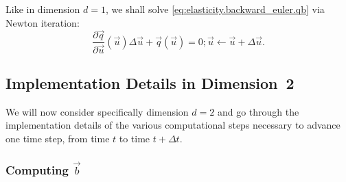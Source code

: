 Like in dimension $d = 1$, we shall solve \eqref{eq:elasticity.backward_euler.qb} via Newton iteration:
\begin{subequations}
\begin{equation*}
\frac{\partial\vec{q}}{\partial\vec{u}} \left( \vec{u} \right) \Delta \vec{u} + \vec{q} \left( \vec{u} \right) = 0;
\end{equation*}
\begin{equation*}
\vec{u} \leftarrow \vec{u} + \Delta \vec{u}.
\end{equation*}
\end{subequations}

\subsection{Implementation Details in Dimension~2}

We will now consider specifically dimension $d = 2$ and go through the implementation details of the various computational steps necessary to advance one time step, from time $t$ to time $t + \Delta t$.

\subsubsection{Computing $\vec{b}$}

